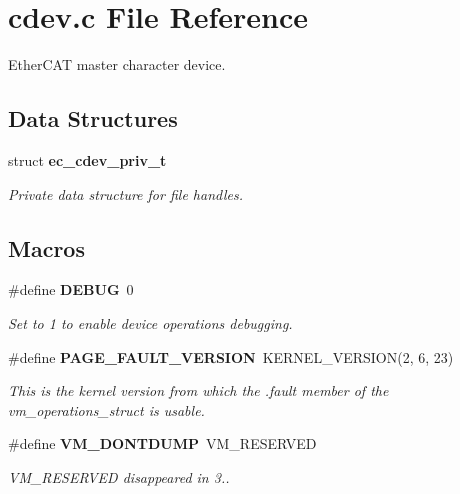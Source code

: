 \section{cdev.\-c File Reference}
\label{cdev_8c}


Ether\-C\-A\-T master character device.  


\subsection*{Data Structures}
\begin{DoxyCompactItemize}
\item 
struct {\bf ec\-\_\-cdev\-\_\-priv\-\_\-t}
\begin{DoxyCompactList}\small\item\em Private data structure for file handles. \end{DoxyCompactList}\end{DoxyCompactItemize}
\subsection*{Macros}
\begin{DoxyCompactItemize}
\item 
\#define {\bf D\-E\-B\-U\-G}~0\label{cdev_8c_ad72dbcf6d0153db1b8d8a58001feed83}

\begin{DoxyCompactList}\small\item\em Set to 1 to enable device operations debugging. \end{DoxyCompactList}\item 
\#define {\bf P\-A\-G\-E\-\_\-\-F\-A\-U\-L\-T\-\_\-\-V\-E\-R\-S\-I\-O\-N}~K\-E\-R\-N\-E\-L\-\_\-\-V\-E\-R\-S\-I\-O\-N(2, 6, 23)\label{cdev_8c_a10f95a3683dceea630bcdd04e89e484f}

\begin{DoxyCompactList}\small\item\em This is the kernel version from which the .fault member of the vm\-\_\-operations\-\_\-struct is usable. \end{DoxyCompactList}\item 
\#define {\bf V\-M\-\_\-\-D\-O\-N\-T\-D\-U\-M\-P}~V\-M\-\_\-\-R\-E\-S\-E\-R\-V\-E\-D\label{cdev_8c_a17f0ec31019517ccc93149007ee45d9d}

\begin{DoxyCompactList}\small\item\em V\-M\-\_\-\-R\-E\-S\-E\-R\-V\-E\-D disappeared in 3.. \end{DoxyCompactList}\end{DoxyCompactItemize}
